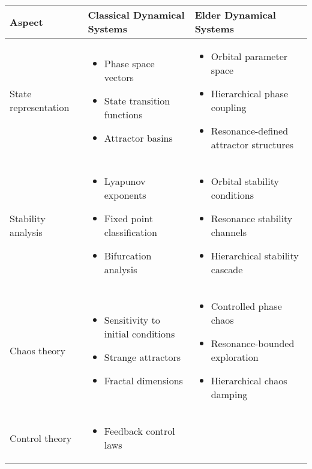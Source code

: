 \begin{center}
\begin{tabular}{|p{3cm}|p{5cm}|p{5cm}|}
\hline
\textbf{Aspect} & \textbf{Classical Dynamical Systems} & \textbf{Elder Dynamical Systems} \\
\hline
State representation & 
\begin{itemize}
    \item Phase space vectors
    \item State transition functions
    \item Attractor basins
\end{itemize} &
\begin{itemize}
    \item Orbital parameter space
    \item Hierarchical phase coupling
    \item Resonance-defined attractor structures
\end{itemize} \\
\hline
Stability analysis & 
\begin{itemize}
    \item Lyapunov exponents
    \item Fixed point classification
    \item Bifurcation analysis
\end{itemize} &
\begin{itemize}
    \item Orbital stability conditions
    \item Resonance stability channels
    \item Hierarchical stability cascade
\end{itemize} \\
\hline
Chaos theory & 
\begin{itemize}
    \item Sensitivity to initial conditions
    \item Strange attractors
    \item Fractal dimensions
\end{itemize} &
\begin{itemize}
    \item Controlled phase chaos
    \item Resonance-bounded exploration
    \item Hierarchical chaos damping
\end{itemize} \\
\hline
Control theory & 
\begin{itemize}
    \item Feedback control laws

\end{itemize}
\end{tabular}
\end{center}
